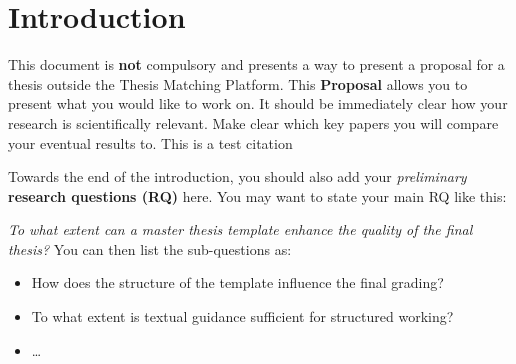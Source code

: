 \section{Introduction}
\label{sec:introduction}
This document is \textbf{not} compulsory and presents a way to present a proposal for a thesis outside the Thesis Matching Platform. This \textbf{Proposal} allows you to present what you would like to work on. It should be immediately clear how your research is scientifically relevant. Make clear which key papers you will compare your eventual results to. 
 This is a test citation \cite{Gruber1995} 

Towards the end of the introduction, you should also add your \textit{preliminary} \textbf{research questions (RQ)} here. You may want to state your main RQ like this:

\noindent\textit{To what extent can a master thesis template enhance the quality of the final thesis?}
You can then list the sub-questions as:
\begin{itemize}
    \item How does the structure of the template influence the final grading?
    \item To what extent is textual guidance sufficient for structured working?
    \item \dots
\end{itemize}